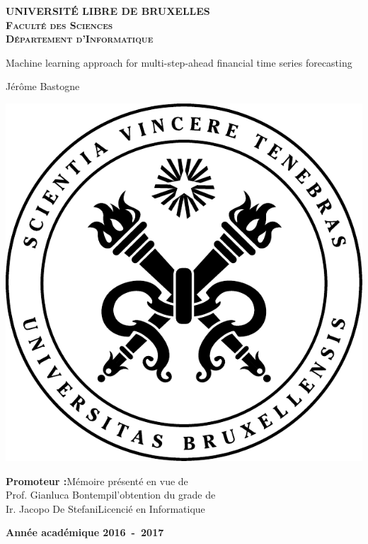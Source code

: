 \documentclass[11pt,a4paper,oneside]{book}
\begin{document}
\nocite{*}

\begin{titlepage}
\begin{center}
\textbf{\textsc{UNIVERSIT\'E LIBRE DE BRUXELLES}}\\
\textbf{\textsc{Faculté des Sciences}}\\
\textbf{\textsc{Département d'Informatique}}
\vfill{}\vfill{}

\begin{center}{\Huge Machine learning approach for multi-step-ahead financial time series forecasting}\end{center}{\Huge \par}
\begin{center}{\large Jérôme Bastogne}\end{center}{\Huge \par}
\vfill{}\vfill{}
\includegraphics[keepaspectratio=true,scale=0.9]{img/ulbBlack.pdf}
\vfill{}\vfill{}
\begin{flushright}{\large \textbf{Promoteur :}}\hfill{}{\large Mémoire présenté en vue de}\\
{\large Prof. Gianluca Bontempi}\hfill{}{\large l'obtention du grade de}\\
{\large Ir. Jacopo De Stefani}\hfill{}{\large Licencié en Informatique}\end{flushright}{\large\par}
\enlargethispage{1cm}
\textbf{Année académique 2016~-~2017}
\end{center}
\end{titlepage}
\end{document}
